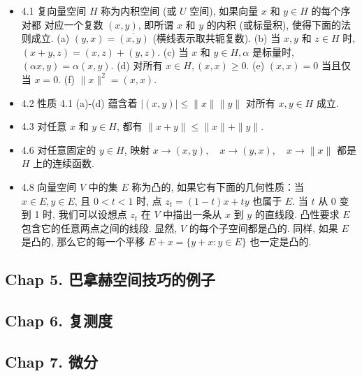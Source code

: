 \begin{itemize}
\item 4.1 复向量空间 $H$ 称为内积空间 (或 $U$ 空间), 如果向量 $x$ 和 $y \in H$ 的每个序对都 对应一个复数 $(x, y)$, 即所谓 $x$ 和 $y$ 的内积 (或标量积), 使得下面的法则成立. (a) $(y, x)=\overline{(x, y)}$ (横线表示取共轭复数). (b) 当 $x, y$ 和 $z \in H$ 时, $(x+y, z)=(x, z)+(y, z)$. (c) 当 $x$ 和 $y \in H, \alpha$ 是标量时, $(\alpha x, y)=\alpha(x, y)$. (d) 对所有 $x \in H,(x, x) \geqslant 0$. (e) $(x, x)=0$ 当且仅当 $x=0$. (f) $\|x\|^{2}=(x, x)$.

\item 4.2 性质 4.1 (a)-(d) 蕴含着 $|(x, y)| \leqslant\|x\|\|y\|$ 对所有 $x, y \in H$ 成立.

\item 4.3 对任意 $x$ 和 $y \in H$, 都有 $\|x+y\| \leqslant\|x\|+\|y\|$.

\item 4.6 对任意固定的 $y \in H$, 映射 $x \rightarrow(x, y), \quad x \rightarrow(y, x), \quad x \rightarrow\|x\|$ 都是 $H$ 上的连续函数.

\item 4.8 向量空间 $V$ 中的集 $E$ 称为凸的, 如果它有下面的几何性质：当 $x \in E, y \in E$, 且 $0<t<1$ 时, 点 $z_{t}=(1-t) x+t y$ 也属于 $E$. 当 $t$ 从 0 变到 1 时, 我们可以设想点 $z_{t}$ 在 $V$ 中描出一条从 $x$ 到 $y$ 的直线段. 凸性要求 $E$ 包含它的任意两点之间的线段. 显然, $V$ 的每个子空间都是凸的. 同样, 如果 $E$ 是凸的, 那么它的每一个平移 $E+x=\{y+x: y \in E\}$ 也一定是凸的.
\end{itemize}


\subsection{Chap 5. 巴拿赫空间技巧的例子}

\subsection{Chap 6. 复测度}

\subsection{Chap 7. 微分}

